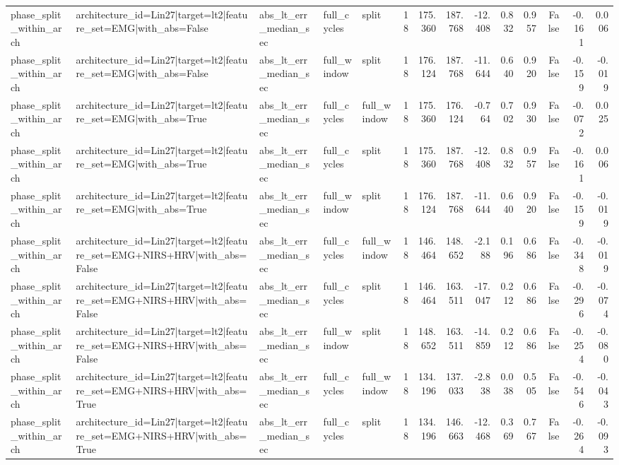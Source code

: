 \begin{table}
\begin{tabular}{lllllrrrrrrrrr}
phase_split_within_arch & architecture_id=Lin27|target=lt2|feature_set=EMG|with_abs=False & abs_lt_err_median_sec & full_cycles & split & 18 & 175.360 & 187.768 & -12.408 & 0.832 & 0.957 & False & -0.161 & 0.006 \\
phase_split_within_arch & architecture_id=Lin27|target=lt2|feature_set=EMG|with_abs=False & abs_lt_err_median_sec & full_window & split & 18 & 176.124 & 187.768 & -11.644 & 0.640 & 0.920 & False & -0.159 & -0.019 \\
phase_split_within_arch & architecture_id=Lin27|target=lt2|feature_set=EMG|with_abs=True & abs_lt_err_median_sec & full_cycles & full_window & 18 & 175.360 & 176.124 & -0.764 & 0.702 & 0.930 & False & -0.072 & 0.025 \\
phase_split_within_arch & architecture_id=Lin27|target=lt2|feature_set=EMG|with_abs=True & abs_lt_err_median_sec & full_cycles & split & 18 & 175.360 & 187.768 & -12.408 & 0.832 & 0.957 & False & -0.161 & 0.006 \\
phase_split_within_arch & architecture_id=Lin27|target=lt2|feature_set=EMG|with_abs=True & abs_lt_err_median_sec & full_window & split & 18 & 176.124 & 187.768 & -11.644 & 0.640 & 0.920 & False & -0.159 & -0.019 \\
phase_split_within_arch & architecture_id=Lin27|target=lt2|feature_set=EMG+NIRS+HRV|with_abs=False & abs_lt_err_median_sec & full_cycles & full_window & 18 & 146.464 & 148.652 & -2.188 & 0.196 & 0.686 & False & -0.348 & -0.019 \\
phase_split_within_arch & architecture_id=Lin27|target=lt2|feature_set=EMG+NIRS+HRV|with_abs=False & abs_lt_err_median_sec & full_cycles & split & 18 & 146.464 & 163.511 & -17.047 & 0.212 & 0.686 & False & -0.296 & -0.074 \\
phase_split_within_arch & architecture_id=Lin27|target=lt2|feature_set=EMG+NIRS+HRV|with_abs=False & abs_lt_err_median_sec & full_window & split & 18 & 148.652 & 163.511 & -14.859 & 0.212 & 0.686 & False & -0.254 & -0.080 \\
phase_split_within_arch & architecture_id=Lin27|target=lt2|feature_set=EMG+NIRS+HRV|with_abs=True & abs_lt_err_median_sec & full_cycles & full_window & 18 & 134.196 & 137.033 & -2.838 & 0.038 & 0.505 & False & -0.546 & -0.043 \\
phase_split_within_arch & architecture_id=Lin27|target=lt2|feature_set=EMG+NIRS+HRV|with_abs=True & abs_lt_err_median_sec & full_cycles & split & 18 & 134.196 & 146.663 & -12.468 & 0.369 & 0.767 & False & -0.264 & -0.093 \\

\end{tabular}
\end{table}
